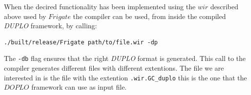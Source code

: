 \documentclass[twoside,11pt,openright]{report}
\newcommand{\DUPLO}{\textit{DUPLO} }
\begin{document}
When the decired functionality has been implemented using the $wir$ described above used by $Frigate$ the compiler can be used, from inside the compiled \DUPLO framework, by calling:

\begin{center}
\begin{verbatim}
./built/release/Frigate path/to/file.wir -dp
\end{verbatim}
\end{center}

The \verb|-db| flag ensures that the right \DUPLO format is generated. This call to the compiler generates different files with different extentions. The file we are interested in is the file with the extention \verb|.wir.GC_duplo| this is the one that the $DOPLO$ framework can use as input file.

\bigskip
\end{document}
